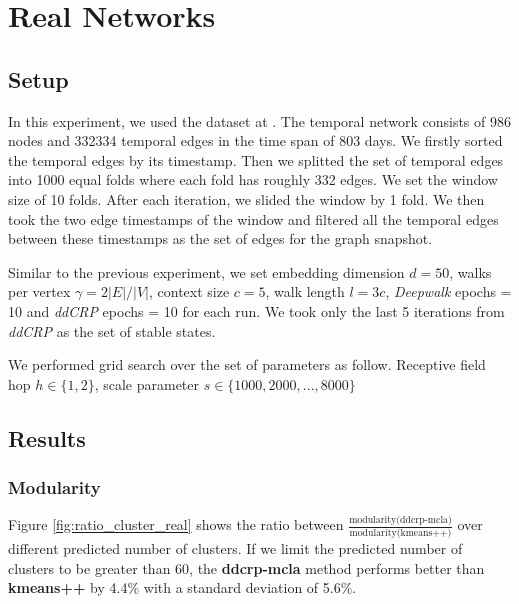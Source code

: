 \section{Real Networks}

\subsection{Setup}

In this experiment, we used the dataset at \cite{paranjape2017motifs}. The temporal network consists of 986 nodes and 332334 temporal edges in the time span of 803 days. We firstly sorted the temporal edges by its timestamp. Then we splitted the set of temporal edges into 1000 equal folds where each fold has roughly 332 edges. We set the window size of 10 folds. After each iteration, we slided the window by 1 fold. We then took the two edge timestamps of the window and filtered all the temporal edges between these timestamps as the set of edges for the graph snapshot.

Similar to the previous experiment, we set embedding dimension $d=50$, walks per vertex $\gamma = 2|E|/|V|$, context size $c = 5$, walk length $l = 3c$, \emph{Deepwalk} epochs = 10 and \emph{ddCRP} epochs = 10 for each run. We took only the last 5 iterations from \emph{ddCRP} as the set of stable states.

We performed grid search over the set of parameters as follow. Receptive field hop $h \in \{1, 2\}$, scale parameter $s \in \{1000, 2000, ..., 8000\}$

\subsection{Results}
\subsubsection{Modularity}
Figure \ref{fig:ratio_cluster_real} shows the ratio between $\frac{\text{modularity(ddcrp-mcla)}}{\text{modularity(kmeans++)}}$ over different predicted number of clusters. If we limit the predicted number of clusters to be greater than 60, the \textbf{ddcrp-mcla} method performs better than \textbf{kmeans++} by 4.4\% with a standard deviation of 5.6\%.

